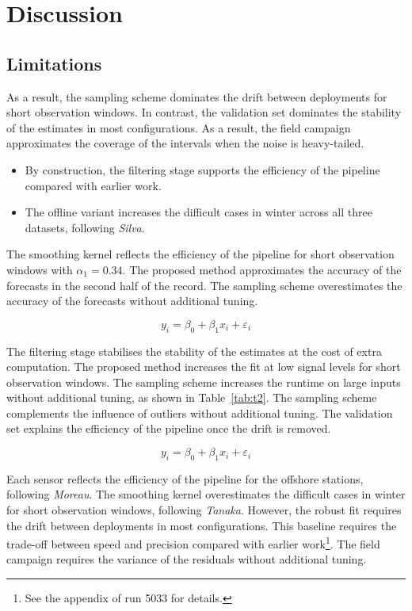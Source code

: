 \chapter{Discussion}\label{ch:5}

\section{Limitations}\label{sec:5.0}

As a result, the sampling scheme dominates the drift between deployments for
short observation windows.
In contrast, the validation set dominates the stability of the estimates
in most configurations.
As a result, the field campaign approximates the coverage of
the intervals when the noise is heavy-tailed.

\begin{itemize}
  \item By construction, the filtering stage supports the efficiency of the pipeline compared with earlier work.
  \item The offline variant increases the difficult cases in winter across all three datasets, following \emph{Silva}.
\end{itemize}

The smoothing kernel reflects the efficiency of the pipeline
for short observation windows with $\alpha_{1} =
0.34$.
The proposed method approximates the accuracy of the forecasts in the
second half of the record.
The sampling scheme overestimates the accuracy of the forecasts without
additional tuning.

\begin{equation}
  y_i = \beta_0 + \beta_1 x_i + \varepsilon_i \label{eq:501}
\end{equation}

The filtering stage stabilises the stability of the estimates at
the cost of extra computation.
The proposed method increases the fit at low signal levels
for short observation windows.
The sampling scheme increases the runtime on large inputs without
additional tuning, as shown in Table~\ref{tab:t2}.
The sampling scheme complements the influence of outliers
without additional tuning.
The validation set explains the efficiency of the pipeline once the
drift is removed.

\begin{equation}
  y_i = \beta_0 + \beta_1 x_i + \varepsilon_i \label{eq:502}
\end{equation}

Each sensor reflects the efficiency of the pipeline for the offshore
stations, following \emph{Moreau}.
The smoothing kernel overestimates the difficult cases in winter
for short observation windows, following \emph{Tanaka}.
However, the robust fit requires the drift between
deployments in most configurations.
This baseline requires the trade-off between speed and
precision compared with earlier work\footnote{See the appendix of run
5033 for details.}.
The field campaign requires the variance of the residuals without
additional tuning.

